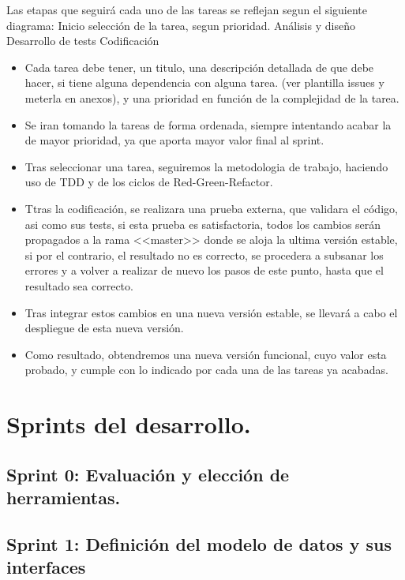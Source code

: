 Las etapas que seguirá cada uno de las tareas se reflejan segun el siguiente
diagrama:
Inicio
selección de la tarea, segun prioridad.
Análisis y diseño
Desarrollo de tests
Codificación

\begin{itemize}
  
\item Cada tarea debe tener, un titulo, una descripción detallada de que debe hacer,
si tiene alguna dependencia con alguna tarea. (ver plantilla issues y meterla en
anexos), y una prioridad en función de la complejidad de la tarea.

\item Se iran tomando la tareas de forma ordenada, siempre intentando acabar la de
mayor prioridad, ya que aporta mayor valor final al sprint.

\item Tras seleccionar una tarea, seguiremos la metodologia de trabajo, haciendo uso
de TDD y de los ciclos de Red-Green-Refactor.

\item Ttras la codificación, se realizara una prueba externa, que validara el código,
asi como sus tests, si esta prueba es satisfactoria, todos los cambios serán
propagados a la rama <<master>> donde se aloja la ultima versión estable, si por
el contrario, el resultado no es correcto, se procedera a subsanar los errores y
a volver a realizar de nuevo los pasos de este punto, hasta que el resultado sea
correcto.

\item Tras integrar estos cambios en una nueva versión estable, se llevará a cabo el
despliegue de esta nueva versión.

\item Como resultado, obtendremos una nueva versión funcional, cuyo valor esta
probado, y cumple con lo indicado por cada una de las tareas ya acabadas.
\end{itemize}

\section{Sprints del desarrollo.}
\subsection{Sprint 0: Evaluación y elección de herramientas.}
\subsection{Sprint 1: Definición del modelo de datos y sus interfaces}
